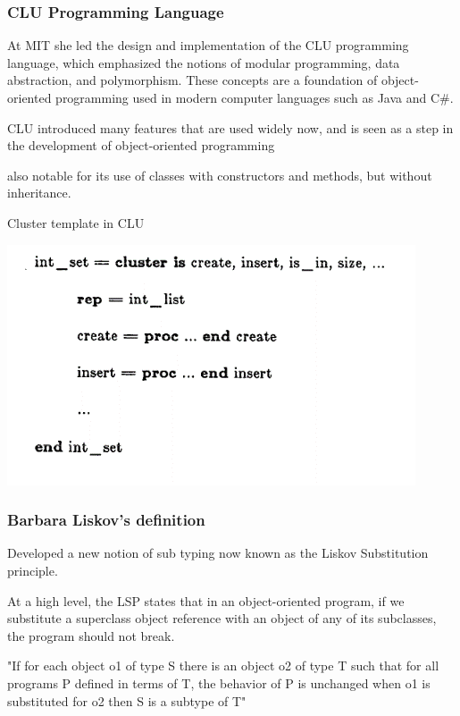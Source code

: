 \documentclass{beamer}
\begin{document}
\begin{frame}
\frametitle{CLU Programming Language}

At MIT she led the design and implementation of the CLU programming language, which emphasized the notions of modular programming, data abstraction, and polymorphism. These concepts are a foundation of object-oriented programming used in modern computer languages such as Java and C\#.

\vspace{5mm}

CLU introduced many features that are used widely now, and is seen as a step in the development of object-oriented programming 

\vspace{5mm}

also notable for its use of classes with constructors and methods, but without inheritance.

\end{frame}
\begin{frame}{Cluster template in CLU}

\includegraphics{cluster.png}
    
\end{frame}


\begin{frame}
\frametitle{Barbara Liskov's definition}

Developed a new notion of sub typing now known as the Liskov Substitution principle.

\vspace{5mm} %

At a high level, the LSP states that in an object-oriented program, if we substitute a superclass object reference with an object of any of its subclasses, the program should not break.\\

\vspace{5 mm}

"If for each object o1 of type S there is an object o2 of type T such that for all programs P defined in terms of T, the behavior of P is unchanged when o1 is substituted for o2 then S is a subtype of T"


\end{frame}
\end{document}
